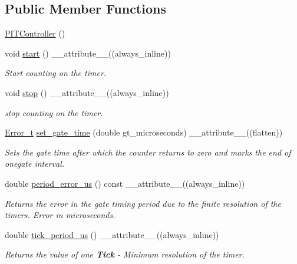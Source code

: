 \subsection*{Public Member Functions}
\begin{DoxyCompactItemize}
\item 
\hyperlink{classPITController_ad9ef4f151495076fad7b0c556e48b117}{P\+I\+T\+Controller} ()
\item 
void \hyperlink{classPITController_a4dae1ed0ada64ebc03665e8f39795e7e}{start} () \+\_\+\+\_\+attribute\+\_\+\+\_\+((always\+\_\+inline))
\begin{DoxyCompactList}\small\item\em Start counting on the timer. \end{DoxyCompactList}\item 
void \hyperlink{classPITController_a5a6e2b00c6355934531a77a62660bec7}{stop} () \+\_\+\+\_\+attribute\+\_\+\+\_\+((always\+\_\+inline))
\begin{DoxyCompactList}\small\item\em stop counting on the timer. \end{DoxyCompactList}\item 
\hyperlink{errors_8hpp_a4e8c0d09726859e3d3369c0da5a1aa7f}{Error\+\_\+t} \hyperlink{classPITController_aaf7a79129a4ea5af057ea8f537b7ae9f}{set\+\_\+gate\+\_\+time} (double gt\+\_\+microseconds) \+\_\+\+\_\+attribute\+\_\+\+\_\+((flatten))
\begin{DoxyCompactList}\small\item\em Sets the gate time after which the counter returns to zero and marks the end of onegate interval. \end{DoxyCompactList}\item 
double \hyperlink{classPITController_a3fedb5ff5a44b664e8132f4e2836b155}{period\+\_\+error\+\_\+us} () const \+\_\+\+\_\+attribute\+\_\+\+\_\+((always\+\_\+inline))
\begin{DoxyCompactList}\small\item\em Returns the error in the gate timing period due to the finite resolution of the timers.  Error in microseconds. \end{DoxyCompactList}\item 
double \hyperlink{classPITController_a2b64ce8a01dc1254002c4ff3c384a6fd}{tick\+\_\+period\+\_\+us} () \+\_\+\+\_\+attribute\+\_\+\+\_\+((always\+\_\+inline))
\begin{DoxyCompactList}\small\item\em Returns the value of one {\bfseries Tick} -\/ Minimum resolution of the timer. \end{DoxyCompactList}\item 

\end{DoxyCompactItemize}
